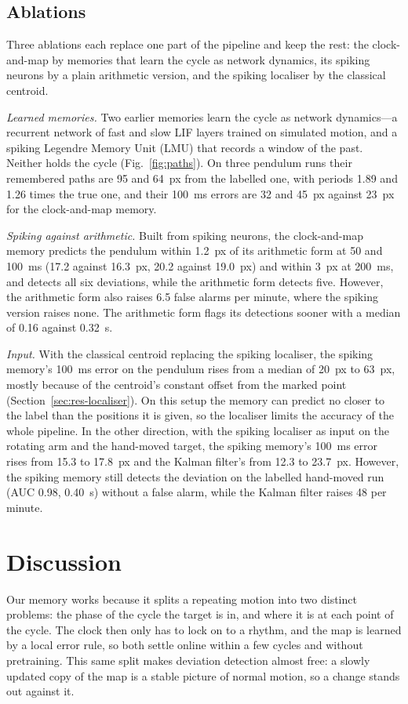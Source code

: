 \documentclass[conference]{IEEEtran}
\begin{document}
\subsection{Ablations}
\label{sec:res-ablations}
Three ablations each replace one part of the pipeline and keep the rest: the clock-and-map by memories that learn the cycle as network dynamics, its spiking neurons by a plain arithmetic version, and the spiking localiser by the classical centroid.

\emph{Learned memories.} Two earlier memories learn the cycle as network dynamics---a recurrent network of fast and slow LIF layers trained on simulated motion, and a spiking Legendre Memory Unit (LMU) \cite{Voelker2019Legendre, hazan2026convolutional, hazan2025neuromorphic} that records a window of the past. Neither holds the cycle (Fig.~\ref{fig:paths}). On three pendulum runs their remembered paths are 95 and 64~px from the labelled one, with periods 1.89 and 1.26 times the true one, and their 100~ms errors are 32 and 45~px against 23~px for the clock-and-map memory.

\emph{Spiking against arithmetic.} Built from spiking neurons, the clock-and-map memory predicts the pendulum within 1.2~px of its arithmetic form at 50 and 100~ms (17.2 against 16.3~px, 20.2 against 19.0~px) and within 3~px at 200~ms, and detects all six deviations, while the arithmetic form detects five. However, the arithmetic form also raises 6.5 false alarms per minute, where the spiking version raises none. The arithmetic form flags its detections sooner with a median of 0.16 against 0.32~s.

\emph{Input.} With the classical centroid replacing the spiking localiser, the spiking memory's 100~ms error on the pendulum rises from a median of 20~px to 63~px, mostly because of the centroid's constant offset from the marked point (Section~\ref{sec:res-localiser}). On this setup the memory can predict no closer to the label than the positions it is given, so the localiser limits the accuracy of the whole pipeline. In the other direction, with the spiking localiser as input on the rotating arm and the hand-moved target, the spiking memory's 100~ms error rises from 15.3 to 17.8~px and the Kalman filter's from 12.3 to 23.7~px. However, the spiking memory still detects the deviation on the labelled hand-moved run (AUC 0.98, 0.40~s) without a false alarm, while the Kalman filter raises 48 per minute.

\section{Discussion}
\label{sec:discussion}
Our memory works because it splits a repeating motion into two distinct problems: the phase of the cycle the target is in, and where it is at each point of the cycle. The clock then only has to lock on to a rhythm, and the map is learned by a local error rule, so both settle online within a few cycles and without pretraining. This same split makes deviation detection almost free: a slowly updated copy of the map is a stable picture of normal motion, so a change stands out against it.
\end{document}
